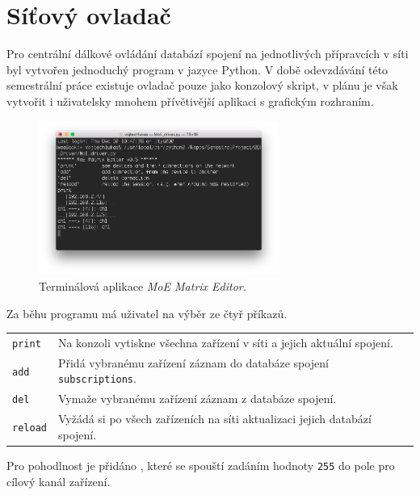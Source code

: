 \chapter{Síťový ovladač}\label{chpt:MatrixEditor}
Pro centrální dálkové ovládání databází spojení na jednotlivých přípravcích v síti byl vytvořen jednoduchý program v jazyce Python. V době odevzdávání této semestrální práce existuje ovladač pouze jako konzolový skript, v plánu je však vytvořit i uživatelsky mnohem přívětivější aplikaci s grafickým rozhraním.

\begin{figure}[h]
    \centering
    \includegraphics[width=0.7\textwidth]{obrazky/MoE_editor_1.png}
    \caption{Terminálová aplikace \emph{MoE Matrix Editor.}}
    \label{fig:Driver_1}
\end{figure}

Za běhu programu má uživatel na výběr ze čtyř příkazů.
\begin{table}[h]
    \centering
        \begin{tabular}{l p{}}
            \texttt{print} & Na konzoli vytiskne všechna zařízení v síti a jejich aktuální spojení. \\
            \texttt{add} & Přidá vybranému zařízení záznam do databáze spojení \texttt{subscriptions}. \\
            \texttt{del} & Vymaže vybranému zařízení záznam z databáze spojení. \\
            \texttt{reload} & Vyžádá si po všech zařízeních na síti aktualizaci jejich databází spojení. \\
        \end{tabular}
\end{table}

Pro pohodlnost je přidáno , které se spouští zadáním hodnoty \texttt{255} do pole pro cílový kanál zařízení.

